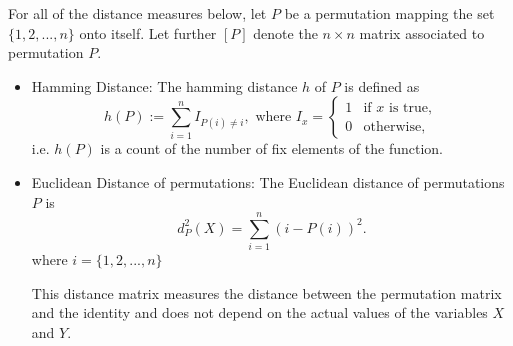 \documentclass[12]{report}
\begin{document}
For all of the distance measures below, let $P$ be a permutation mapping  the set $\{1, 2, ..., n\}$ onto itself. Let further $[P]$ denote the $n \times n$ matrix associated to permutation $P$.

\begin{itemize}

\item Hamming Distance: The hamming distance $h$ of $P$ is defined as 
\[
h(P) := \sum_{i=1}^n I_{P(i) \neq i},  \text{ where } I_{x} = \left \{ 
\begin{array}{ll}
1 & \text{if } x \text{ is true},\\
0 & \text{otherwise},
\end{array} \right.
\]
i.e. $h(P)$ is a count of the number of fix elements of the function.

\item Euclidean Distance of permutations: The Euclidean distance of permutations $P$ is 
\[
d^2_P(X) = \sum_{i=1}^n ( i - P(i))^2.
\]
where $i = \{1, 2, ..., n\}$



This distance matrix measures the distance between the permutation matrix and the identity and does not depend on the actual values of the variables $X$ and $Y$. 









\end{itemize}
\end{document}
